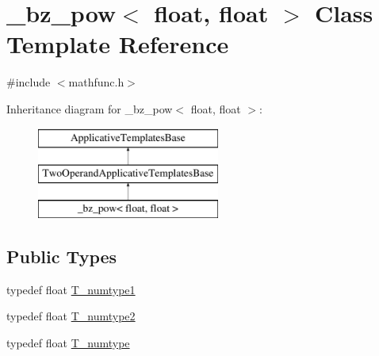 \hypertarget{class__bz__pow_3_01float_00_01float_01_4}{}\section{\+\_\+bz\+\_\+pow$<$ float, float $>$ Class Template Reference}
\label{class__bz__pow_3_01float_00_01float_01_4}


{\ttfamily \#include $<$mathfunc.\+h$>$}

Inheritance diagram for \+\_\+bz\+\_\+pow$<$ float, float $>$\+:\begin{figure}[H]
\begin{center}
\leavevmode
\includegraphics[height=3.000000cm]{class__bz__pow_3_01float_00_01float_01_4}
\end{center}
\end{figure}
\subsection*{Public Types}
\begin{DoxyCompactItemize}
\item 
typedef float \hyperlink{class__bz__pow_3_01float_00_01float_01_4_aaf9b305e9f6eaa2592d8fdf882868257}{T\+\_\+numtype1}
\item 
typedef float \hyperlink{class__bz__pow_3_01float_00_01float_01_4_aee0d61f645f0363bce496c1f3118f4fb}{T\+\_\+numtype2}
\item 
typedef float \hyperlink{class__bz__pow_3_01float_00_01float_01_4_ac1fa1c38bfd853ffb73fb86b486ee82e}{T\+\_\+numtype}
\end{DoxyCompactItemize}
